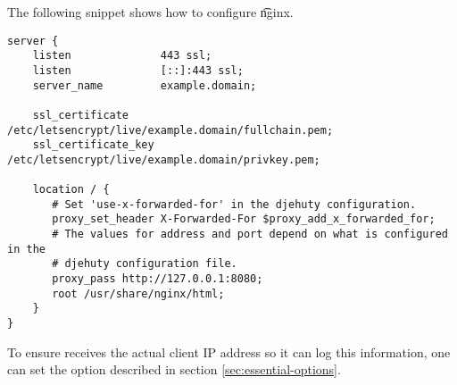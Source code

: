   The following snippet shows how to configure \t{nginx}.

\begin{lstlisting}
server {
    listen              443 ssl;
    listen              [::]:443 ssl;
    server_name         example.domain;

    ssl_certificate     /etc/letsencrypt/live/example.domain/fullchain.pem;
    ssl_certificate_key /etc/letsencrypt/live/example.domain/privkey.pem;

    location / {
       # Set 'use-x-forwarded-for' in the djehuty configuration.
       proxy_set_header X-Forwarded-For $proxy_add_x_forwarded_for;
       # The values for address and port depend on what is configured in the
       # djehuty configuration file.
       proxy_pass http://127.0.0.1:8080;
       root /usr/share/nginx/html;
    }
}
\end{lstlisting}

  To ensure  receives the actual client IP address so it can log
  this information, one can set the  option
  described in section \ref{sec:essential-options}.
